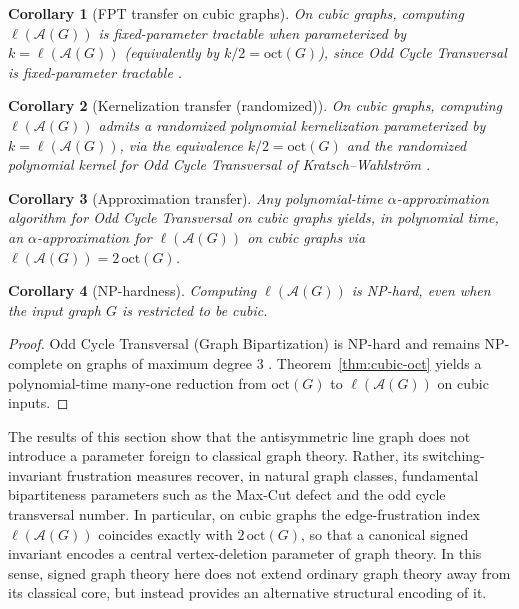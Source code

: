 \documentclass[11pt]{article}
\newtheorem{corollary}{Corollary}
\theoremstyle{plain}
\begin{document}
\begin{corollary}[FPT transfer on cubic graphs]
On cubic graphs, computing $\ell(\mathcal A(G))$ is fixed-parameter tractable when parameterized by
$k=\ell(\mathcal A(G))$ (equivalently by $k/2=\mathrm{oct}(G)$),
since Odd Cycle Transversal is fixed-parameter tractable \cite{ReedSmithVetta2004}.
\end{corollary}

\begin{corollary}[Kernelization transfer (randomized)]
On cubic graphs, computing $\ell(\mathcal A(G))$ admits a randomized polynomial kernelization
parameterized by $k=\ell(\mathcal A(G))$, via the equivalence $k/2=\mathrm{oct}(G)$
and the randomized polynomial kernel for Odd Cycle Transversal
of Kratsch--Wahlstr\"om \cite{KratschWahlstrom2012}.
\end{corollary}

\begin{corollary}[Approximation transfer]
Any polynomial-time $\alpha$-approximation algorithm for Odd Cycle Transversal on cubic graphs yields,
in polynomial time, an $\alpha$-approximation for $\ell(\mathcal A(G))$ on cubic graphs via
$\ell(\mathcal A(G))=2\,\mathrm{oct}(G)$.
\end{corollary}

\begin{corollary}[NP-hardness]\label{cor:nphard-frustration}
Computing $\ell(\mathcal A(G))$ is NP-hard, even when the input graph $G$ is restricted to be cubic.
\end{corollary}

\begin{proof}
Odd Cycle Transversal (Graph Bipartization) is NP-hard and remains NP-complete on graphs of
maximum degree $3$ \cite{ChoiNakajimaRim1989}. Theorem~\ref{thm:cubic-oct} yields a
polynomial-time many-one reduction from $\mathrm{oct}(G)$ to $\ell(\mathcal A(G))$ on cubic inputs.
\end{proof}

\medskip
\noindent
The results of this section show that the antisymmetric line graph does not introduce a parameter foreign to classical graph theory. Rather, its switching-invariant frustration measures recover, in natural graph classes, fundamental bipartiteness parameters such as the Max-Cut defect and the odd cycle transversal number. In particular, on cubic graphs the edge-frustration index $\ell(\mathcal A(G))$ coincides exactly with $2\,\mathrm{oct}(G)$, so that a canonical signed invariant encodes a central vertex-deletion parameter of graph theory. In this sense, signed graph theory here does not extend ordinary graph theory away from its classical core, but instead provides an alternative structural encoding of it.
\medskip
\end{document}
